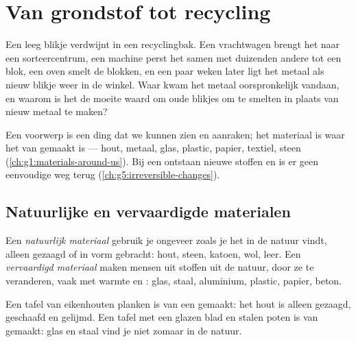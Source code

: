 \chapter{Van grondstof tot recycling}\label{ch:g5:raw-materials-and-recycling}

Een leeg blikje verdwijnt in een recyclingbak. Een vrachtwagen brengt
het naar een sorteercentrum, een machine perst het samen met duizenden
andere tot een blok, een oven smelt de blokken, en een paar weken later
ligt het metaal als nieuw blikje weer in de winkel. Waar kwam het metaal
oorspronkelijk vandaan, en waarom is het de moeite waard om oude blikjes
om te smelten in plaats van nieuw metaal te maken?

\begin{recall}
Een voorwerp is een ding dat we kunnen zien en aanraken; het materiaal
is waar het van gemaakt is --- hout, metaal, glas, plastic, papier,
textiel, steen (\cref{ch:g1:materials-around-us}). Bij een  ontstaan nieuwe stoffen en is er geen eenvoudige weg terug
(\cref{ch:g5:irreversible-changes}).
\end{recall}

\section{Natuurlijke en vervaardigde materialen}

\begin{definition}\label{def:g5:raw-materials-and-recycling:natural-material}
Een \emph{natuurlijk materiaal} gebruik je
ongeveer zoals je het in de natuur vindt, alleen gezaagd of in vorm
gebracht: hout, steen, katoen, wol, leer. Een \emph{vervaardigd
materiaal} maken mensen uit stoffen uit de
natuur, door ze te veranderen, vaak met warmte en : glas, staal, aluminium, plastic, papier, beton.
\end{definition}

\begin{example}\label{ex:g5:raw-materials-and-recycling:tables}
Een tafel van eikenhouten planken is van een 
gemaakt: het hout is alleen gezaagd, geschaafd en gelijmd. Een tafel met
een glazen blad en stalen poten is van  gemaakt:
glas en staal vind je niet zomaar in de natuur.
\end{example}

